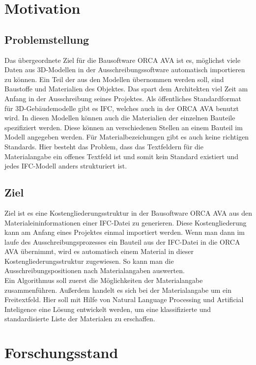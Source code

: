 \begin{onehalfspace}
\section{Motivation}
\subsection{Problemstellung}
\label{s:intro}
Das übergeordnete Ziel für die Bausoftware ORCA AVA ist es, möglichst viele Daten aus 3D-Modellen in der Ausschreibungssoftware automatisch importieren zu können. Ein Teil der aus den Modellen übernommen werden soll, sind Baustoffe und Materialien des Objektes. Das spart dem Architekten viel Zeit am Anfang in der Ausschreibung seines Projektes.
Als öffentliches Standardformat für 3D-Gebäudemodelle gibt es IFC, welches auch in der ORCA AVA benutzt wird. In diesen Modellen können auch die Materialien der einzelnen Bauteile spezifiziert werden. Diese können an verschiedenen Stellen an einem Bauteil im Modell angegeben werden. Für Materialbezeichungen gibt es auch keine richtigen Standards. Hier besteht das Problem, dass das Textfeldern für die Materialangabe ein offenes Textfeld ist und somit kein Standard existiert und jedes IFC-Modell anders strukturiert ist.


\subsection{Ziel}
Ziel ist es eine Kostengliederungsstruktur in der Bausoftware ORCA AVA aus den Materialeininformationen einer IFC-Datei zu generieren. Diese Kostengliederung kann am Anfang eines Projektes einmal importiert werden. Wenn man dann im laufe des Ausschreibungsprozesses ein Bauteil aus der IFC-Datei in die ORCA AVA übernimmt, wird es automatisch einem Material in dieser Kostengliederungsstruktur zugewiesen. So kann man die Ausschreibungspositionen nach Materialangaben auswerten.
\\


Ein Algorithmus soll zuerst die Möglichkeiten der Materialangabe zusammenführen. Außerdem handelt es sich bei der Materialangabe um ein Freitextfeld. Hier soll mit Hilfe von Natural Language Processing und Artificial Inteligence eine Lösung entwickelt werden, um eine klassifizierte und standardisierte Liste der Materialen zu erschaffen. 
\section{Forschungsstand}

\end{onehalfspace}
